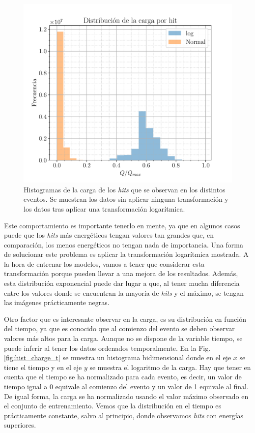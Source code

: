\documentclass[a4paper,12pt,oneside,titlepage]{book}
\begin{document}
\begin{figure}[h!]
  \centering
  \includegraphics[scale=0.85]{hist_charge.pdf}
  \caption{Histogramas de la carga de los \textit{hits} que se observan en los distintos eventos. Se muestran los datos sin aplicar ninguna transformación y los datos tras aplicar una transformación logarítmica.}
  \label{fig:hist_charge}
\end{figure}


Este comportamiento es importante tenerlo en mente, ya que en algunos casos puede que los \textit{hits} más energéticos tengan valores tan grandes que, en comparación, los menos energéticos no tengan nada de importancia. Una forma de solucionar este problema es aplicar la transformación logarítmica mostrada. A la hora de entrenar los modelos, vamos a tener que considerar esta transformación porque pueden llevar a una mejora de los resultados. Además, esta distribución exponencial puede dar lugar a que, al tener mucha diferencia entre los valores donde se encuentran la mayoría de \textit{hits} y el máximo, se tengan las imágenes prácticamente negras.

Otro factor que es interesante observar en la carga, es su distribución en función del tiempo, ya que es conocido que al comienzo del evento se deben observar valores más altos para la carga. Aunque no se dispone de la variable tiempo, se puede inferir al tener los datos ordenados temporalmente. En la Fig. \ref{fig:hist_charge_t} se muestra un histograma bidimensional donde en el eje $x$ se tiene el tiempo y en el eje $y$ se muestra el logaritmo de la carga. Hay que tener en cuenta que el tiempo se ha normalizado para cada evento, es decir, un valor de tiempo igual a 0 equivale al comienzo del evento y un valor de 1 equivale al final. De igual forma, la carga se ha normalizado usando el valor máximo observado en el conjunto de entrenamiento. Vemos que la distribución en el tiempo es prácticamente constante, salvo al principio, donde observamos \textit{hits} con energías superiores.
\end{document}
